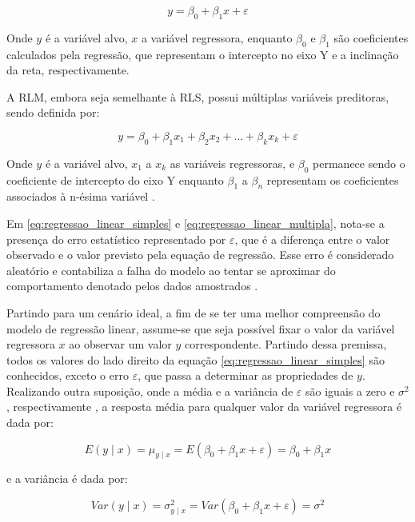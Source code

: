 \begin{equation}
	y = \beta_0 + \beta_1 x + \varepsilon
	\label{eq:regressao_linear_simples}
\end{equation}

Onde $y$ é a variável alvo, $x$ a variável regressora, enquanto $\beta_0$ e $\beta_1$ são coeficientes calculados pela regressão, que representam o intercepto no eixo Y e a inclinação da reta, respectivamente.

A RLM, embora seja semelhante à RLS, possui múltiplas variáveis preditoras, sendo definida por:

\begin{equation}
	y = \beta_0 + \beta_1 x_{1} + \beta_2 x_{2} + ... + \beta_k x_{k} + \varepsilon
	\label{eq:regressao_linear_multipla}
\end{equation}

Onde $y$ é a variável alvo, $x_{1}$ a $x_{k}$ as variáveis regressoras, e $\beta_0$ permanece sendo o coeficiente de intercepto do eixo Y enquanto $\beta_1$ a $\beta_n$ representam os coeficientes associados à n-ésima variável \cite{sassi2012}.

Em \ref{eq:regressao_linear_simples} e \ref{eq:regressao_linear_multipla}, nota-se a presença do erro estatístico representado por $\varepsilon$, que é a diferença entre o valor observado e o valor previsto pela equação de regressão. Esse erro é considerado aleatório e contabiliza a falha do modelo ao tentar se aproximar do comportamento denotado pelos dados amostrados \cite{montgomery2012}.

Partindo para um cenário ideal, a fim de se ter uma melhor compreensão do modelo de regressão linear, assume-se que seja possível fixar o valor da variável regressora $x$ ao observar um valor $y$ correspondente. Partindo dessa premissa, todos os valores do lado direito da equação \ref{eq:regressao_linear_simples} são conhecidos, exceto o erro $\varepsilon$, que passa a determinar as propriedades de $y$. Realizando outra suposição, onde a média e a variância de $\varepsilon$ são iguais a zero e $\sigma^2$, respectivamente \cite{montgomery2012}, a resposta média para qualquer valor da variável regressora é dada por:

\begin{equation}
	E(y \mid x) = \mu_{y \mid x} = E(\beta_0 + \beta_1x + \varepsilon) = \beta_0 + \beta_1x
\end{equation}

e a variância é dada por:

\begin{equation}
	Var (y \mid x) = \sigma_{y \mid x}^2 = Var(\beta_0 + \beta_1x + \varepsilon) = \sigma^2
\end{equation}


